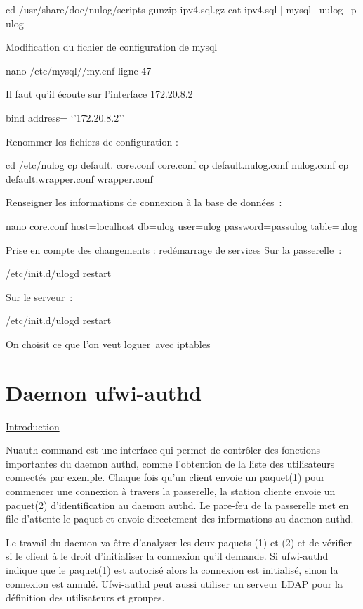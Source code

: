 \documentclass[12pt]{report}
\begin{document}
cd /usr/share/doc/nulog/scripts
gunzip ipv4.sql.gz
cat ipv4.sql | mysql –uulog –p ulog

Modification du fichier de configuration de mysql

nano /etc/mysql//my.cnf
ligne 47

Il faut qu’il écoute sur l’interface 172.20.8.2

bind address= ‘’172.20.8.2’’

Renommer les fichiers de configuration :

cd /etc/nulog
cp default. core.conf core.conf
cp default.nulog.conf nulog.conf
cp default.wrapper.conf wrapper.conf

Renseigner les informations de connexion à la base de données :

nano core.conf
host=localhost
db=ulog
user=ulog
password=passulog
table=ulog

Prise en compte des changements : redémarrage de services
Sur la passerelle :

/etc/init.d/ulogd restart

Sur le serveur :

/etc/init.d/ulogd restart


On choisit ce que l’on veut loguer avec iptables

\chapter{Daemon ufwi-authd}
\underline{Introduction}

Nuauth command est une interface qui permet de contrôler des fonctions importantes du daemon authd, 
comme l'obtention de la liste des utilisateurs connectés par exemple.
Chaque fois qu'un client envoie un paquet(1) pour commencer une connexion à travers la 
passerelle, la station cliente envoie un paquet(2) d'identification au daemon authd. Le 
pare-feu de la passerelle met en file d'attente le paquet et envoie directement des 
informations au daemon authd.

Le travail du daemon va être d'analyser les deux paquets (1) et (2) et de vérifier si 
le client à le droit d'initialiser la connexion qu'il demande.
Si ufwi-authd indique que le paquet(1) est autorisé alors la connexion est initialisé,
sinon la connexion est annulé. Ufwi-authd peut aussi utiliser un serveur LDAP pour la
définition des utilisateurs et groupes.
\end{document}
